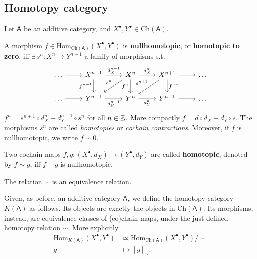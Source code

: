 \subsection{Homotopy category}
Let $\mathsf{A}$ be an additive category, and $X^{\bullet}, Y^{\bullet} \in \mathrm{Ch}(\mathsf{A})$.

\begin{defn}
	A morphism $f \in \mathrm{Hom}_{\mathrm{Ch}(\mathsf{A})} \left( X^{\bullet}, Y^{\bullet} \right)$ is
	\textbf{nullhomotopic}, or \textbf{homotopic to zero}, iff
	$\exists\, s^n: X^n \to Y^{n-1}$ a family of morphisms s.t.
	\begin{equation}
	\begin{tikzcd}
		\ldots \arrow[r, "", rightarrow] &
		X^{n-1} \arrow[r, "d_X^{n-1}", rightarrow] \arrow[d, "f^{n-1}"', rightarrow] &
		X^n \arrow[r, "d^n_X", rightarrow] \arrow[d, "f^n"', rightarrow] \arrow[ld, "s^n"', rightarrow] &
		X^{n+1} \arrow[r, "", rightarrow] \arrow[d, "f^{n+1}", rightarrow] \arrow[dl, "s^{n+1}"', rightarrow] &
		\ldots \\
		\ldots \arrow[r, "", rightarrow] &
		Y^{n-1} \arrow[r, "d_Y^{n-1}"', rightarrow] &
		Y^n \arrow[r, "d^n_Y"', rightarrow] &
		Y^{n+1} \arrow[r, "", rightarrow] &
		\ldots
	\end{tikzcd}
	\end{equation} 
	$f^n = s^{n+1} \circ d_X^{n} + d_Y^{n-1} \circ s^n$ for all $n \in \mathbb{Z}$.
	More compactly $f = d \circ d_X + d_Y \circ s$.
	The morphisms $s^n$ are called \textit{homotopies} or \textit{cochain contractions}.
	Moreover, if $f$ is nullhomotopic, we write $f \sim 0$.
\end{defn}

\begin{defn}
	Two cochain maps $f,g: \left( X^{\bullet}, d_{X} \right) \to \left( Y^{\bullet}, d_{Y} \right)$
	are called \textbf{homotopic}, denoted by $f \sim g$, iff
	$f - g$ is nullhomotopic.
\end{defn}

\begin{rem}[]
	The relation $\sim$ is an equivalence relation.
\end{rem}

\begin{defn}
	Given, as before, an additive category $\mathsf{A}$, we define the homotopy category
	$K(\mathsf{A})$ as follows.
	Its objects are exactly the objects in $\mathrm{Ch}(\mathsf{A})$.
	Its morphisms, instead, are equivalence classes of (co)chain maps, under the just defined homotopy relation $\sim$.
	More explicitly
	\begin{align}
		\mathrm{Hom}_{K(\mathsf{A})} \left( X^\bullet, Y^\bullet \right)
		&\simeq \mathrm{Hom}_{\mathrm{Ch}(\mathsf{A})}\left( X^\bullet, Y^\bullet \right)/\sim\\
		g &\mapsto \left[ g \right]_{\sim}
	.\end{align} 
\end{defn}

